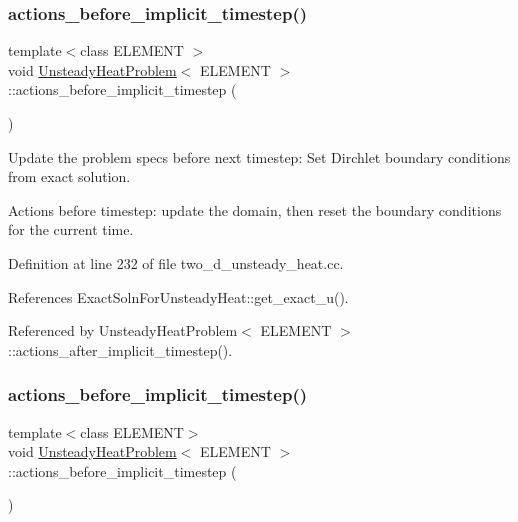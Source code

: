 \mbox{\label{classUnsteadyHeatProblem_a7074e52f6a3a791549687e1b4ddd059a}} 
\subsubsection{\texorpdfstring{actions\+\_\+before\+\_\+implicit\+\_\+timestep()}{actions\_before\_implicit\_timestep()}\hspace{0.1cm}{\footnotesize\ttfamily [1/2]}}
{\footnotesize\ttfamily template$<$class E\+L\+E\+M\+E\+NT $>$ \\
void \hyperlink{classUnsteadyHeatProblem}{Unsteady\+Heat\+Problem}$<$ E\+L\+E\+M\+E\+NT $>$\+::actions\+\_\+before\+\_\+implicit\+\_\+timestep (\begin{DoxyParamCaption}{ }\end{DoxyParamCaption})}



Update the problem specs before next timestep\+: Set Dirchlet boundary conditions from exact solution. 

Actions before timestep\+: update the domain, then reset the boundary conditions for the current time. 

Definition at line 232 of file two\+\_\+d\+\_\+unsteady\+\_\+heat.\+cc.



References Exact\+Soln\+For\+Unsteady\+Heat\+::get\+\_\+exact\+\_\+u().



Referenced by Unsteady\+Heat\+Problem$<$ E\+L\+E\+M\+E\+N\+T $>$\+::actions\+\_\+after\+\_\+implicit\+\_\+timestep().

\mbox{\label{classUnsteadyHeatProblem_a7074e52f6a3a791549687e1b4ddd059a}} 
\subsubsection{\texorpdfstring{actions\+\_\+before\+\_\+implicit\+\_\+timestep()}{actions\_before\_implicit\_timestep()}\hspace{0.1cm}{\footnotesize\ttfamily [2/2]}}
{\footnotesize\ttfamily template$<$class E\+L\+E\+M\+E\+NT$>$ \\
void \hyperlink{classUnsteadyHeatProblem}{Unsteady\+Heat\+Problem}$<$ E\+L\+E\+M\+E\+NT $>$\+::actions\+\_\+before\+\_\+implicit\+\_\+timestep (\begin{DoxyParamCaption}{ }\end{DoxyParamCaption})}



